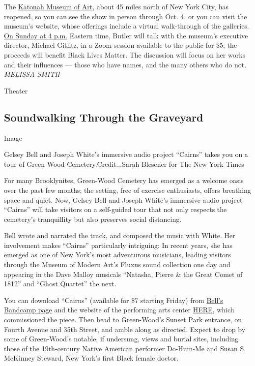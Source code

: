 The \href{http://www.katonahmuseum.org/}{Katonah Museum of Art}, about
45 miles north of New York City, has reopened, so you can see the show
in person through Oct. 4, or you can visit the museum's website, whose
offerings include a virtual walk-through of the galleries.
\href{http://www.katonahmuseum.org/programs-and-events/BisaButler-Virtual-BisaButler-LiveInConversation/}{On
Sunday at 4 p.m.} Eastern time, Butler will talk with the museum's
executive director, Michael Gitlitz, in a Zoom session available to the
public for \$5; the proceeds will benefit Black Lives Matter. The
discussion will focus on her works and their influences --- those who
have names, and the many others who do not.\\
\emph{MELISSA SMITH}

Theater

\hypertarget{soundwalking-through-the-graveyard}{%
\subsection{Soundwalking Through the
Graveyard}\label{soundwalking-through-the-graveyard}}

Image

Gelsey Bell and Joseph White's immersive audio project ``Cairns'' takes
you on a tour of Green-Wood Cemetery.Credit...Sarah Blesener for The New
York Times

For many Brooklynites, Green-Wood Cemetery has emerged as a welcome
oasis over the past few months; the setting, free of exercise
enthusiasts, offers breathing space and quiet. Now, Gelsey Bell and
Joseph White's immersive audio project ``Cairns'' will take visitors on
a self-guided tour that not only respects the cemetery's tranquillity
but also preserves social distancing.

Bell wrote and narrated the track, and composed the music with White.
Her involvement makes ``Cairns'' particularly intriguing: In recent
years, she has emerged as one of New York's most adventurous musicians,
leading visitors through the Museum of Modern Art's Fluxus sound
collection one day and appearing in the Dave Malloy musicals ``Natasha,
Pierre \& the Great Comet of 1812'' and ``Ghost Quartet'' the next.

You can download ``Cairns'' (available for \$7 starting Friday) from
\href{https://gelseybell.bandcamp.com/album/cairns}{Bell's Bandcamp
page} and the website of the performing arts center
\href{http://here.org/events/}{HERE}, which commissioned the piece. Then
head to Green-Wood's Sunset Park entrance, on Fourth Avenue and 35th
Street, and amble along as directed. Expect to drop by some of
Green-Wood's notable, if undersung, views and burial sites, including
those of the 19th-century Native American performer Do-Hum-Me and Susan
S. McKinney Steward, New York's first Black female doctor.

